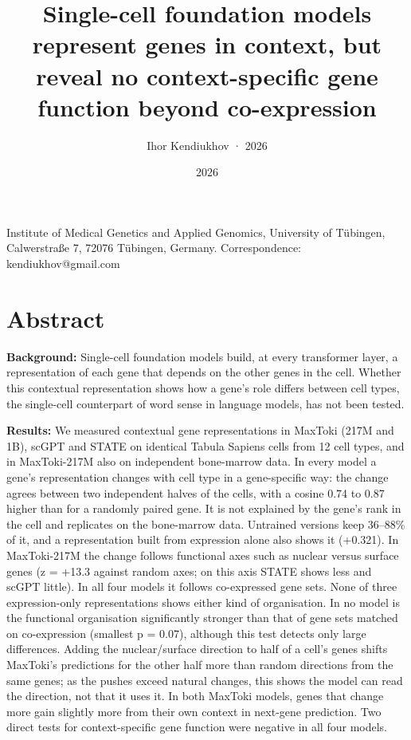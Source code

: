\documentclass[
  11pt,
]{article}
\title{Single-cell foundation models represent genes in context, but
reveal no context-specific gene function beyond co-expression}
\author{Ihor Kendiukhov · 2026}
\date{2026}
\begin{document}
\maketitle

Institute of Medical Genetics and Applied Genomics, University of
Tübingen, Calwerstraße 7, 72076 Tübingen, Germany. Correspondence:
kendiukhov@gmail.com

\section{Abstract}\label{abstract}

\textbf{Background:} Single-cell foundation models build, at every
transformer layer, a representation of each gene that depends on the
other genes in the cell. Whether this contextual representation shows
how a gene's role differs between cell types, the single-cell
counterpart of word sense in language models, has not been tested.

\textbf{Results:} We measured contextual gene representations in MaxToki
(217M and 1B), scGPT and STATE on identical Tabula Sapiens cells from 12
cell types, and in MaxToki-217M also on independent bone-marrow data. In
every model a gene's representation changes with cell type in a
gene-specific way: the change agrees between two independent halves of
the cells, with a cosine 0.74 to 0.87 higher than for a randomly paired
gene. It is not explained by the gene's rank in the cell and replicates
on the bone-marrow data. Untrained versions keep 36--88\% of it, and a
representation built from expression alone also shows it (+0.321). In
MaxToki-217M the change follows functional axes such as nuclear versus
surface genes (z = +13.3 against random axes; on this axis STATE shows
less and scGPT little). In all four models it follows co-expressed gene
sets. None of three expression-only representations shows either kind of
organisation. In no model is the functional organisation significantly
stronger than that of gene sets matched on co-expression (smallest p =
0.07), although this test detects only large differences. Adding the
nuclear/surface direction to half of a cell's genes shifts MaxToki's
predictions for the other half more than random directions from the same
genes; as the pushes exceed natural changes, this shows the model can
read the direction, not that it uses it. In both MaxToki models, genes
that change more gain slightly more from their own context in next-gene
prediction. Two direct tests for context-specific gene function were
negative in all four models.
\end{document}
